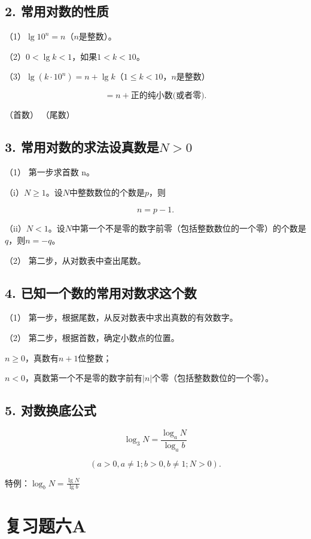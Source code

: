 \subsection{2. 常用对数的性质}

（1）\(\lg 10^{n} = n\)（\(n\)是整数）。

（2）\(0 < \lg k < 1\)，如果\(1 < k < 10\)。

（3）\(\lg (k\cdot 10^{n}) = n + \lg k\)（\(1\leqslant k < 10\)，\(n\)是整数）

\[
= n + \text{正的纯小数(或者零)}.
\]

（首数） （尾数）

\subsection{\texorpdfstring{3. 常用对数的求法设真数是\(N > 0\)}{3. 常用对数的求法设真数是N \textgreater{} 0}}

（1） 第一步求首数 n。

（i）\(N \geqslant 1\)。设\(N\)中整数数位的个数是\(p\)，则

\[
n = p - 1.
\]

（ii）\(N < 1\)。设\(N\)中第一个不是零的数字前零（包括整数数位的一个零）的个数是\(q\)，则\(n = -q\)。

（2） 第二步，从对数表中查出尾数。

\subsection{4. 已知一个数的常用对数求这个数}

（1） 第一步，根据尾数，从反对数表中求出真数的有效数字。

（2） 第二步，根据首数，确定小数点的位置。

\(n \geqslant 0\)，真数有\(n + 1\)位整数；

\(n < 0\)，真数第一个不是零的数字前有\(|n|\)个零（包括整数数位的一个零）。

\subsection{5. 对数换底公式}

\[
\log_{3} N = \frac{\log_{a} N}{\log_{a} b}
\]

\[
(a > 0, a \neq 1; b > 0, b \neq 1; N > 0).
\]

特例：\(\log_b N = \frac{\lg N}{\lg b}\)

\section{复习题六A}

